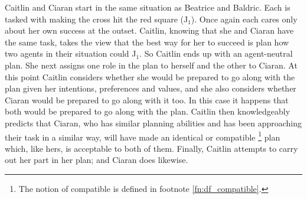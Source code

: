 \documentclass[12pt,\papersize]{extarticle}
\begin{document}
Caitlin and Ciaran start in the same situation as Beatrice and Baldric. 
Each is tasked with making the cross hit the red square (J$_1$). 
Once again each cares only about her own success at the outset. 
Caitlin, knowing that she and Ciaran have the same task, takes the view that the best way for her to succeed is plan how two agents in their situation could J$_1$.  
So Caitlin ends up with an agent-neutral plan.
She next assigns one role in the plan to herself and the other to Ciaran.
At this point Caitlin considers whether she would be prepared to go along with the plan given her intentions, preferences and values, and she also considers whether Ciaran would be prepared to go along with it too. 
In this case it happens that both would be prepared to go along with the plan.
Caitlin then knowledgeably predicts that Ciaran, who has similar planning abilities and has been approaching their task in a similar way, will have made an identical or compatible%
\footnote{
The notion of compatible is defined in footnote \vref{fn:df_compatible}.
}
%
 plan which, like hers, is acceptable to both of them.
Finally, Caitlin attempts to carry out her part in her plan; and Ciaran does likewise.
\end{document}
